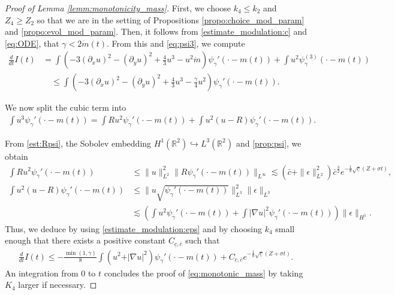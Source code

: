 \documentclass[reqno,10pt]{amsart}
\numberwithin{equation}{section}
\begin{document}
	
	\begin{proof}[Proof of Lemma \ref{lemm:monotonicity_mass}]
		First, we choose $k_4 \le k_2$ and $Z_4 \ge Z_2$ so that we are in the setting of Propositions \ref{propo:choice_mod_param} and \ref{propo:evol_mod_param}. Then, it follows
		from \eqref{estimate_modulation:c} and \eqref{eq:ODE}, that $\gamma < 2\dot{m}(t)$. From this and \eqref{eq:psi3}, we compute
		\begin{align*}
			\frac{d}{dt} I (t)
			& = \int \left( -3 (\partial_x u)^2 - (\partial_y u)^2 + \frac43 u^3 - u^2 \dot{m} \right)  \psi_\gamma'  \left( \cdot - m(t)\right) + \int u^2  \psi_\gamma^ {(3)} \left( \cdot - m(t)\right) \\ 
			& \quad \leq \int \left( -3 (\partial_x u)^2 - (\partial_y u)^2 + \frac{4}{3}u^3 - \frac{\gamma}{4} u^2\right)  \psi_\gamma' \left( \cdot - m(t)\right).
		\end{align*}
		
		We now split the cubic term into
		\begin{align*}
			\int u^3 \psi_\gamma'\left( \cdot - m(t)\right) =  \int R u^2 \psi_\gamma'\left( \cdot - m(t)\right) + \int u^2 (u-R) \psi_\gamma'\left( \cdot - m(t)\right).
		\end{align*}
		
		
		
		From \eqref{est:Rpsi}, the Sobolev embedding $H^1(\mathbb{R}^2) \hookrightarrow L^3(\mathbb{R}^2)$ and \eqref{prop:psi}, we obtain
		\begin{align}
			\int R u^2 \psi_\gamma'\left( \cdot - m(t)\right) & \leq \| u \|_{L^2}^2 \| R \psi_\gamma'\left( \cdot - m(t)\right) \|_{L^\infty} \lesssim \left( \bar{c} + \| \epsilon\|_{L^2}^2 \right) \bar{c}^\frac32 e^{-\frac18 \sqrt{\underline{c}}\left( Z + \sigma t\right)}, \label{eq:mono_nonlinear_1}\\
			\int u^2 (u-R) \psi_\gamma'\left( \cdot - m(t)\right) & \leq \| u \sqrt{\psi_\gamma'\left( \cdot - m(t)\right)} \|_{L^3}^2 \| \epsilon \|_{L^3} \nonumber \\
			& \lesssim \left( \int u^2 \psi_\gamma'\left( \cdot - m(t)\right)  + \int \vert \nabla u \vert^2 \psi_\gamma'\left( \cdot - m(t)\right) \right) \| \epsilon \|_{H^1}. \label{eq:mono_nonlinear_2}
		\end{align}
		Thus, we deduce by using \eqref{estimate_modulation:eps} and by choosing $k_4$ small enough that
		there exists a positive constant $C_{\underline{c},\overline{c}}$ such that
		\begin{align}\label{eq:bound_deriv_mass}
			\frac{d}{dt} I(t) \leq - \frac{\min(1,\gamma)}{8} \int \left( u^2 + \vert \nabla u \vert^2 \right) \psi_\gamma'\left( \cdot - m(t)\right) + C_{\underline{c},\overline{c}} e^{-\frac1{8} \sqrt{\underline{c}}\left( Z + \sigma t\right)}.
		\end{align}
		An integration from $0$ to $t$ concludes the proof of \eqref{eq:monotonic_mass} by taking $K_4$ larger if necessary.
	\end{proof}
\end{document}
